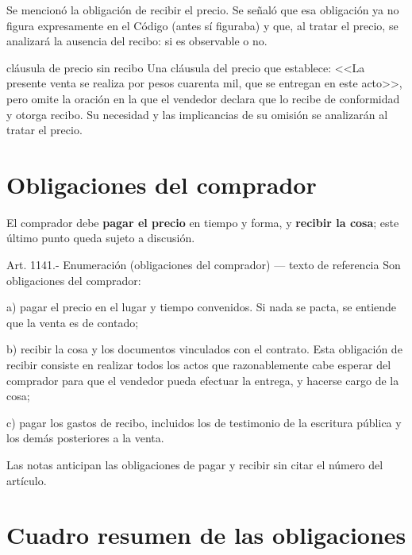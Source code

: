 \documentclass[12pt,oneside]{book}
\begin{document}
Se mencionó la obligación de recibir el precio. Se señaló que esa obligación ya no figura expresamente en el Código (antes sí figuraba) y que, al tratar el precio, se analizará la ausencia del recibo: si es observable o no.

\begin{example}{cláusula de precio sin recibo}
Una cláusula del precio que establece: <<La presente venta se realiza por pesos cuarenta mil, que se entregan en este acto>>, pero omite la oración en la que el vendedor declara que lo recibe de conformidad y otorga recibo. Su necesidad y las implicancias de su omisión se analizarán al tratar el precio.
\end{example}


\section{Obligaciones del comprador}

El comprador debe \textbf{pagar el precio} en tiempo y forma, y \textbf{recibir la cosa}; este último punto queda sujeto a discusión.

\begin{norma}{Art. 1141.- Enumeración (obligaciones del comprador) --- texto de referencia}
Son obligaciones del comprador:

a) pagar el precio en el lugar y tiempo convenidos. Si nada se pacta, se entiende que la venta es de contado;

b) recibir la cosa y los documentos vinculados con el contrato. Esta obligación de recibir consiste en realizar todos los actos que razonablemente cabe esperar del comprador para que el vendedor pueda efectuar la entrega, y hacerse cargo de la cosa;

c) pagar los gastos de recibo, incluidos los de testimonio de la escritura pública y los demás posteriores a la venta.
\end{norma}

Las notas anticipan las obligaciones de pagar y recibir sin citar el número del artículo.

\section{Cuadro resumen de las obligaciones}
\end{document}
